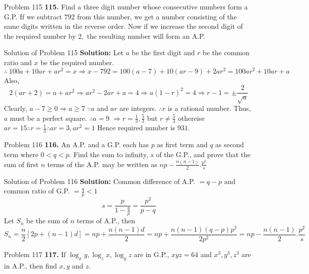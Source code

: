 \documentclass[aspectratio=1610,8pt]{beamer}
\begin{document}
\begin{frame}{Problem 115}
  \textbf{115.} Find a three digit number whose consecutive numbers form a G.P. If we subtract $792$ from this number, we get a
  number consisting of the same digits written in the reverse order. Now if we increase the second digit of the required number by
  $2,$ the resulting number will form an A.P.
\end{frame}
\begin{frame}{Solution of Problem 115}
  \textbf{Solution:} Let $a$ be the first digit and $r$ be the common ratio and $x$ be the required number.
  $$\therefore~ 100a + 10ar + ar^2 = x \Rightarrow x - 792 = 100(a - 7) + 10(ar - 9) + 2ar^2 = 100ar^2 + 10ar + a$$
  Also, $$2(ar + 2) = a + ar^2 \Rightarrow ar^2 - 2ar + a = 4 \Rightarrow a(1 - r)^2 = 4 \Rightarrow r - 1 =
  \pm\frac{2}{\sqrt{a}}$$
  \linebreak\linebreak
  Clearly, $a - 7 \geq 0 \Rightarrow a \geq 7$
  \linebreak\linebreak
  $\because a$ and $ar$ are integers. $\therefore r$ is a rational number. Thus, $a$ must be a perfect square. $\therefore a = 9$
  $\Rightarrow r = \frac{1}{3}, \frac{5}{3}$ but $r\neq \frac{5}{3}$ othereise $ar = 15\therefore r = \frac{1}{3}\therefore ar = 3,
  ar^2 = 1$
  \linebreak\linebreak
  Hence required number is $931.$
\end{frame}
\begin{frame}{Problem 116}
  \textbf{116.} An A.P. and a G.P. each has $p$ as first term and $q$ as second term where $0 < q < p.$ Find the sum to infinity,
  $s$ of the G.P., and prove that the sum of first $n$ terms of the A.P. may be written as $np - \frac{n(n - 1)}{2}.\frac{p^2}{s}$
\end{frame}
\begin{frame}{Solution of Problem 116}
  \textbf{Solution:} Common difference of A.P. $= q - p$ and common ratio of G.P. $= \frac{q}{p} < 1$
  $$s = \frac{p}{1 - \frac{q}{p}} = \frac{p^2}{p - q}$$
  Let $S_n$ be the sum of $n$ terms of A.P., then
  $$S_n = \frac{n}{2}[2p + (n - 1)d] = np + \frac{n(n - 1)d}{2} = np + \frac{n(n - 1)(q - p)p^2}{2p^2} = np - \frac{n(n -
    1)}{2}.\frac{p^2}{s}$$
\end{frame}
\begin{frame}{Problem 117}
  \textbf{117.} If $\log_xy, \log_zx, \log_yz$ are in G.P., $xyz = 64$ and $x^3, y^3, z^3$ are in A.P., then find $x, y$ and $z.$
\end{frame}
\end{document}

